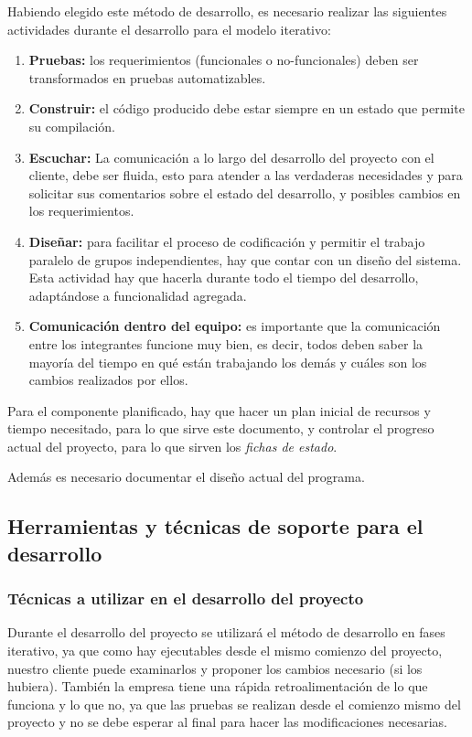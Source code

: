 \documentclass[letterpaper,titlepage,spanish,10pt]{article}
\begin{document}
Habiendo elegido este m\'etodo de desarrollo, es necesario realizar las
siguientes actividades durante el desarrollo para el modelo iterativo:

\begin{enumerate}
\item \textbf{Pruebas:} los requerimientos (funcionales o no-funcionales) deben
  ser transformados en pruebas automatizables.
\item \textbf{Construir:} el c\'odigo producido debe estar siempre en un
  estado que permite su compilaci\'on.
\item \textbf{Escuchar:} La comunicaci\'on a lo largo del desarrollo del proyecto
con el cliente, debe ser fluida, esto para atender a las 
  verdaderas necesidades y para solicitar sus comentarios sobre el
  estado del desarrollo, y posibles cambios en los requerimientos.
\item \textbf{Dise\~nar:} para facilitar el proceso de codificaci\'on y permitir el
  trabajo paralelo de grupos independientes, hay que contar con un
  dise\~no del sistema.
  Esta actividad hay que hacerla durante todo el tiempo del desarrollo,
  adapt\'andose a funcionalidad agregada.
\item \textbf{Comunicaci\'on dentro del equipo:} es importante
  que la comunicaci\'on entre los integrantes funcione
  muy bien, es decir, todos deben saber la mayor\'ia del tiempo en qu\'e
  est\'an trabajando los dem\'as y cu\'ales son los cambios realizados por
  ellos.
\end{enumerate}

Para el componente planificado, hay que hacer un plan inicial de
recursos y tiempo necesitado, para lo que sirve este documento, y
controlar el progreso actual del proyecto, para lo que sirven los
\emph{fichas de estado}.

Adem\'as es necesario documentar el dise\~no actual del programa.


\subsection{Herramientas y t\'ecnicas de soporte para el desarrollo}
\subsubsection{T\'ecnicas a utilizar en el desarrollo del proyecto}

Durante el desarrollo del proyecto se utilizar\'a el m\'etodo de desarrollo en fases iterativo, 
ya que como hay ejecutables desde el mismo comienzo del proyecto, nuestro cliente puede examinarlos 
y proponer los cambios necesario (si los hubiera). Tambi\'en la empresa tiene una r\'apida 
retroalimentaci\'on de lo que funciona y lo que no, ya que las pruebas se realizan desde el 
comienzo mismo del proyecto y no se debe esperar al final para hacer las modificaciones necesarias.\\
\end{document}
